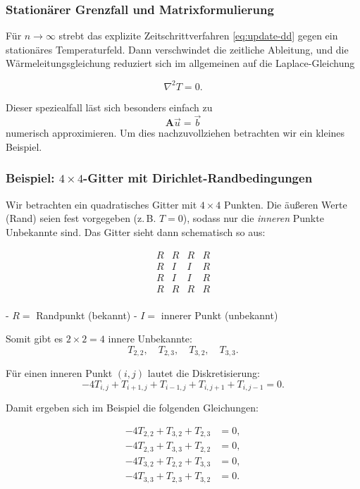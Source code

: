 \subsubsection{Stationärer Grenzfall und Matrixformulierung}

Für $n \to \infty$ strebt das explizite Zeitschrittverfahren \eqref{eq:update-dd} gegen ein stationäres Temperaturfeld. 
Dann verschwindet die zeitliche Ableitung, und die Wärmeleitungsgleichung reduziert sich im allgemeinen auf die Laplace-Gleichung


\begin{equation}
	\nabla^2 T
	= 
	0.
\end{equation}

Dieser speziealfall läst sich besonders einfach zu 
\begin{equation}
	\mathbf{A} \vec{u}
	=
	\vec{b}
\end{equation}
numerisch approximieren.
Um dies nachzuvollziehen betrachten wir ein kleines Beispiel.

\subsubsection*{Beispiel: $4\times 4$-Gitter mit Dirichlet-Randbedingungen}

Wir betrachten ein quadratisches Gitter mit $4\times 4$ Punkten.  
Die äußeren Werte (Rand) seien fest vorgegeben (z.\,B. $T=0$), sodass nur die \emph{inneren} Punkte Unbekannte sind.  
Das Gitter sieht dann schematisch so aus:

\[
\begin{array}{cccc}
	R & R & R & R \\
	R & I & I & R \\
	R & I & I & R \\
	R & R & R & R \\
\end{array}
\]

- $R =$ Randpunkt (bekannt)  
- $I =$ innerer Punkt (unbekannt)

Somit gibt es $2\times 2 = 4$ innere Unbekannte: 
\[
T_{2,2}, \quad T_{2,3}, \quad T_{3,2}, \quad T_{3,3}.
\]


Für einen inneren Punkt $(i,j)$ lautet die Diskretisierung:
\[
-4T_{i,j} + T_{i+1,j} + T_{i-1,j} + T_{i,j+1} + T_{i,j-1} = 0.
\]

Damit ergeben sich im Beispiel die folgenden Gleichungen:

\begin{align*}
	-4T_{2,2} + T_{3,2} + T_{2,3} &= 0, \\
	-4T_{2,3} + T_{3,3} + T_{2,2} &= 0, \\
	-4T_{3,2} + T_{2,2} + T_{3,3} &= 0, \\
	-4T_{3,3} + T_{2,3} + T_{3,2} &= 0.
\end{align*}


